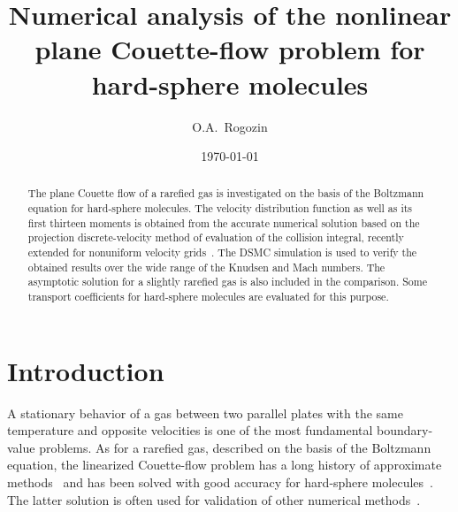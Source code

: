 \documentclass[aip,pof,preprint]{revtex4-1}
\begin{document}
\title{
    Numerical analysis of the nonlinear plane Couette-flow problem for hard-sphere molecules
}

\author{O.A.~Rogozin}%

\date{\today}

\begin{abstract}
    The plane Couette flow of a rarefied gas is investigated on the basis of
    the Boltzmann equation for hard-sphere molecules.
    The velocity distribution function as well as its first thirteen moments is obtained from
    the accurate numerical solution based on the projection discrete-velocity method
    of evaluation of the collision integral, recently extended for nonuniform velocity grids~\cite{Dodulad2015}.
    The DSMC simulation is used to verify the obtained results over the wide range of the Knudsen and Mach numbers.
    The asymptotic solution for a slightly rarefied gas is also included in the comparison.
    Some transport coefficients for hard-sphere molecules are evaluated for this purpose.
\end{abstract}


\maketitle

\section{Introduction}

A stationary behavior of a gas between two parallel plates with the same temperature
and opposite velocities is one of the most fundamental boundary-value problems.
As for a rarefied gas, described on the basis of the Boltzmann equation,
the linearized Couette-flow problem has a long history of approximate methods~\cite{Willis1962}
and has been solved with good accuracy for hard-sphere molecules~\cite{Ohwada1990}.
The latter solution is often used for validation of other numerical methods~\cite{Fan2001,Aidun2010}.
\end{document}
